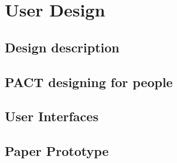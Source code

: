 \chapter{User Design}


\section{Design description}



\section{PACT designing for people}


\section{User Interfaces}


\section{Paper Prototype}

